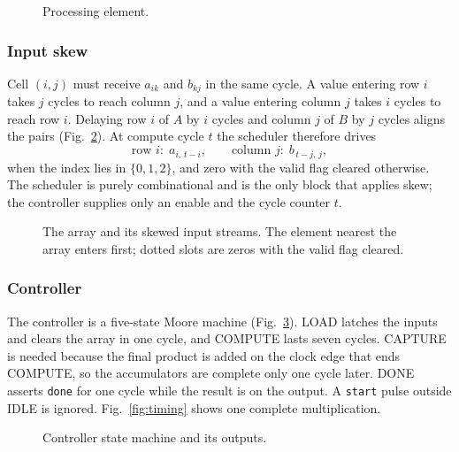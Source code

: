 \documentclass[conference]{IEEEtran}
\newcommand{\code}[1]{\texttt{#1}}
\begin{document}
\begin{figure}[t]
\centering
\resizebox{0.8\columnwidth}{!}{}
\caption{Processing element.}
\label{fig:pe}
\end{figure}

\subsubsection{Input skew}
Cell $(i,j)$ must receive $a_{ik}$ and $b_{kj}$ in the same cycle. A value entering row $i$ takes $j$ cycles to reach column $j$, and a value entering column $j$ takes $i$ cycles to reach row $i$. Delaying row $i$ of $A$ by $i$ cycles and column $j$ of $B$ by $j$ cycles aligns the pairs (Fig.~\ref{fig:array}). At compute cycle $t$ the scheduler therefore drives
\begin{equation}
\text{row } i:\; a_{i,\,t-i}, \qquad \text{column } j:\; b_{\,t-j,\,j},
\label{eq:skew}
\end{equation}
when the index lies in $\{0, 1, 2\}$, and zero with the valid flag cleared otherwise. The scheduler is purely combinational and is the only block that applies skew; the controller supplies only an enable and the cycle counter $t$.

\begin{figure}[t]
\centering
\resizebox{0.88\columnwidth}{!}{}
\caption{The array and its skewed input streams. The element nearest the array enters first; dotted slots are zeros with the valid flag cleared.}
\label{fig:array}
\end{figure}

\subsubsection{Controller}
The controller is a five-state Moore machine (Fig.~\ref{fig:fsm}). LOAD latches the inputs and clears the array in one cycle, and COMPUTE lasts seven cycles. CAPTURE is needed because the final product is added on the clock edge that ends COMPUTE, so the accumulators are complete only one cycle later. DONE asserts \code{done} for one cycle while the result is on the output. A \code{start} pulse outside IDLE is ignored. Fig.~\ref{fig:timing} shows one complete multiplication.

\begin{figure}[t]
\centering
\resizebox{0.85\columnwidth}{!}{}
\caption{Controller state machine and its outputs.}
\label{fig:fsm}
\end{figure}
\end{document}
